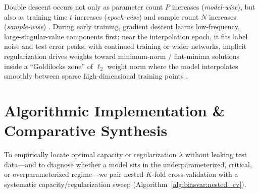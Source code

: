 \documentclass[../../../../master.tex]{subfiles}
\begin{document}
\begin{intuition}
\label{int:biasvar:double_descent}
Double descent occurs not only as parameter count $P$ increases (\emph{model-wise}), but also as training time $t$ increases (\emph{epoch-wise}) and sample count $N$ increases (\emph{sample-wise}) . During early training, gradient descent learns low-frequency, large-singular-value components first; near the interpolation epoch, it fits label noise and test error peaks; with continued training or wider networks, implicit regularization drives weights toward minimum-norm / flat-minima solutions inside a ``Goldilocks zone'' of $\ell_2$ weight norm where the model interpolates smoothly between sparse high-dimensional training points .
\end{intuition}

\section{Algorithmic Implementation \& Comparative Synthesis}
\label{sec:biasvar:algorithm}

To empirically locate optimal capacity or regularization $\lambda$ without leaking test data---and to diagnose whether a model sits in the underparameterized, critical, or overparameterized regime---we pair nested $K$-fold cross-validation   with a systematic capacity/regularization sweep (Algorithm~\ref{alg:biasvar:nested_cv}).
\end{document}
